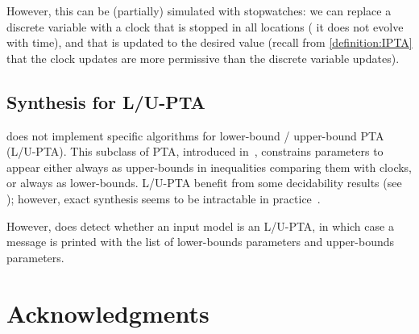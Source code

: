However, this can be (partially) simulated with stopwatches: we can replace a discrete variable with a clock that is stopped in all locations (\ie{} it does not evolve with time), and that is updated to the desired value (recall from \cref{definition:IPTA} that the clock updates are more permissive than the discrete variable updates).




\section{Synthesis for L/U-PTA}

\imitator{} does not implement specific algorithms for lower-bound / upper-bound PTA (L/U-PTA).
This subclass of PTA, introduced in~\cite{HRSV02}, constrains parameters to appear either always as upper-bounds in inequalities comparing them with clocks, or always as lower-bounds.
L/U-PTA benefit from some decidability results (see \eg{} \cite{HRSV02,BlT09,JLR15,AM15}); however, exact synthesis seems to be intractable in practice~\cite{JLR15}.

However, \imitator{} does detect whether an input model is an L/U-PTA, in which case a message is printed with the list of lower-bounds parameters and upper-bounds parameters.



\chapter{Acknowledgments}

